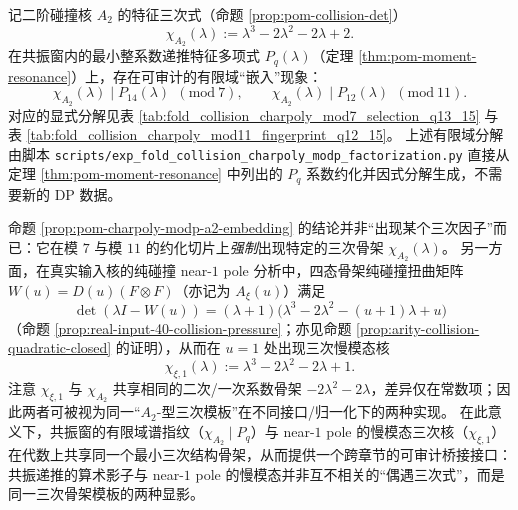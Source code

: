 \begin{proposition}\label{prop:pom-charpoly-modp-a2-embedding}
记二阶碰撞核 \(A_2\) 的特征三次式（命题 \ref{prop:pom-collision-det}）
\[
\chi_{A_2}(\lambda):=\lambda^3-2\lambda^2-2\lambda+2.
\]
在共振窗内的最小整系数递推特征多项式 \(P_q(\lambda)\)（定理 \ref{thm:pom-moment-resonance}）上，存在可审计的有限域“嵌入”现象：
\[
\boxed{\;
\chi_{A_2}(\lambda)\mid P_{14}(\lambda)\ \ (\mathrm{mod}\ 7),
\qquad
\chi_{A_2}(\lambda)\mid P_{12}(\lambda)\ \ (\mathrm{mod}\ 11).\;}
\]
对应的显式分解见表 \ref{tab:fold_collision_charpoly_mod7_selection_q13_15} 与表 \ref{tab:fold_collision_charpoly_mod11_fingerprint_q12_15}。
上述有限域分解由脚本 \texttt{scripts/exp\_fold\_collision\_charpoly\_modp\_factorization.py} 直接从定理 \ref{thm:pom-moment-resonance} 中列出的 \(P_q\) 系数约化并因式分解生成，不需要新的 DP 数据。
\end{proposition}

\begin{remark}\label{rem:pom-a2-cubic-skeleton-crosschapter}
命题 \ref{prop:pom-charpoly-modp-a2-embedding} 的结论并非“出现某个三次因子”而已：它在模 \(7\) 与模 \(11\) 的约化切片上\emph{强制}出现特定的三次骨架 \(\chi_{A_2}(\lambda)\)。
另一方面，在真实输入核的纯碰撞 near-\(1\) pole 分析中，四态骨架纯碰撞扭曲矩阵 \(W(u)=D(u)(F\otimes F)\)（亦记为 \(A_\xi(u)\)）满足
\[
\det(\lambda I-W(u))=(\lambda+1)\bigl(\lambda^3-2\lambda^2-(u+1)\lambda+u\bigr)
\]
（命题 \ref{prop:real-input-40-collision-pressure}；亦见命题 \ref{prop:arity-collision-quadratic-closed} 的证明），从而在 \(u=1\) 处出现三次慢模态核
\[
\chi_{\xi,1}(\lambda):=\lambda^3-2\lambda^2-2\lambda+1.
\]
注意 \(\chi_{\xi,1}\) 与 \(\chi_{A_2}\) 共享相同的二次/一次系数骨架 \(-2\lambda^2-2\lambda\)，差异仅在常数项；因此两者可被视为同一“\(A_2\)-型三次模板”在不同接口/归一化下的两种实现。
在此意义下，共振窗的有限域谱指纹（\(\chi_{A_2}\mid P_q\)）与 near-\(1\) pole 的慢模态三次核（\(\chi_{\xi,1}\)）在代数上共享同一个最小三次结构骨架，从而提供一个跨章节的可审计桥接接口：共振递推的算术影子与 near-\(1\) pole 的慢模态并非互不相关的“偶遇三次式”，而是同一三次骨架模板的两种显影。
\end{remark}

